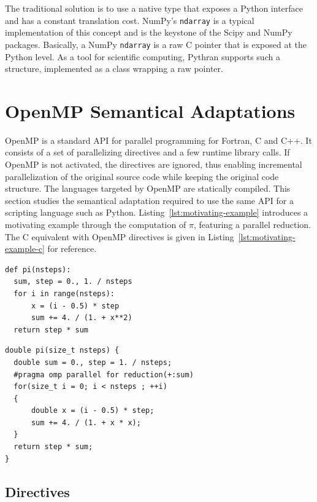 \documentclass[conference]{IEEEtran}
\begin{document}
The traditional solution is to use a native type that exposes a Python interface
and has a constant translation cost. NumPy's \texttt{ndarray} is a typical
implementation of this concept and is the keystone of the Scipy and NumPy
packages. Basically, a NumPy \texttt{ndarray} is a raw C pointer that is exposed
at the Python level. As a tool for scientific computing, Pythran supports such a
structure, implemented as a class wrapping a raw pointer.


\section{OpenMP Semantical Adaptations}\label{sec:python-openmp}

OpenMP is a standard API for parallel programming for Fortran, C and C++. It
consists of a set of parallelizing directives and a few runtime library calls.
If OpenMP is not activated, the directives are ignored, thus enabling
incremental parallelization of the original source code while keeping the
original code structure. The languages targeted by OpenMP are statically
compiled. This section studies the semantical adaptation required to use the
same API for a scripting language such as Python.
Listing~\ref{lst:motivating-example} introduces a motivating example through the
computation of $\pi$, featuring a parallel reduction. The C equivalent with
OpenMP directives is given in Listing~\ref{lst:motivating-example-c} for
reference.

\begin{lstlisting}[float, label={lst:motivating-example}, caption={Motivating
example: computing $\pi$ in Python.}]
def pi(nsteps):
  sum, step = 0., 1. / nsteps
  for i in range(nsteps):
      x = (i - 0.5) * step
      sum += 4. / (1. + x**2)
  return step * sum
\end{lstlisting}

\begin{lstlisting}[float, label={lst:motivating-example-c}, caption={Motivating
example: computing $\pi$ in C with OpenMP.}]
double pi(size_t nsteps) {
  double sum = 0., step = 1. / nsteps;
  #pragma omp parallel for reduction(+:sum)
  for(size_t i = 0; i < nsteps ; ++i)
  {
      double x = (i - 0.5) * step;
      sum += 4. / (1. + x * x);
  }
  return step * sum;
}
\end{lstlisting}


\subsection{Directives}
\end{document}
